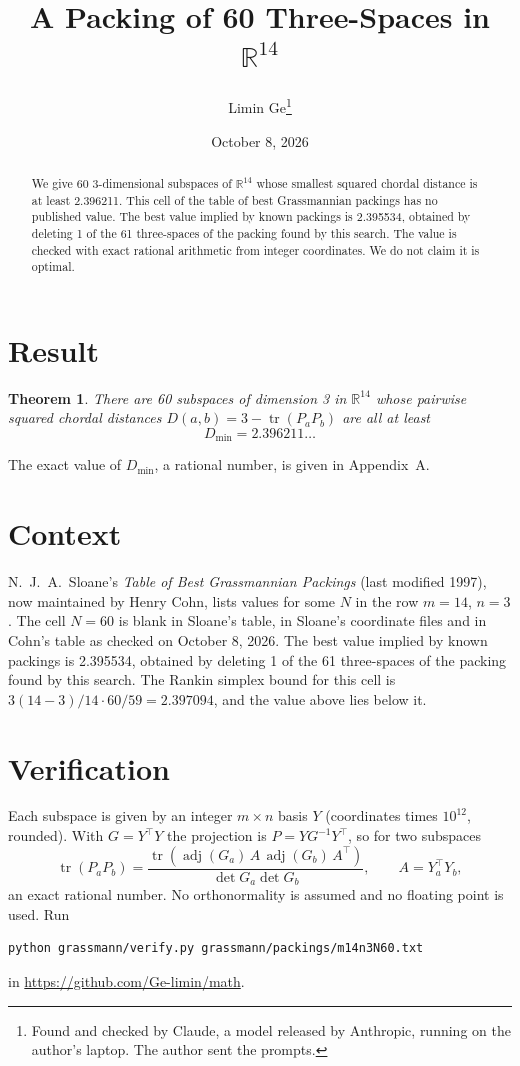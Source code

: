 \documentclass[11pt,a4paper]{article}
\title{A Packing of 60 Three-Spaces in $\mathbb{R}^{14}$}
\author{Limin Ge\thanks{Found and checked by Claude, a model released by Anthropic, running on the author's laptop. The author sent the prompts.}}
\date{October 8, 2026}
\newtheorem*{theorem}{Theorem}
\begin{document}
\maketitle
\begin{abstract}
We give 60 3-dimensional subspaces of $\mathbb{R}^{14}$ whose smallest squared chordal distance is at least 2.396211. This cell of the table of best Grassmannian packings has no published value. The best value implied by known packings is 2.395534, obtained by deleting 1 of the 61 three-spaces of the packing found by this search. The value is checked with exact rational arithmetic from integer coordinates. We do not claim it is optimal.
\end{abstract}

\section{Result}
\begin{theorem}
There are 60 subspaces of dimension 3 in $\mathbb{R}^{14}$ whose pairwise squared chordal distances $D(a,b) = 3 - \operatorname{tr}(P_aP_b)$ are all at least
\[ D_{\min} = 2.396211\ldots \]
\end{theorem}
The exact value of $D_{\min}$, a rational number, is given in Appendix~A.


\section{Context}
N.~J.~A.~Sloane's \emph{Table of Best Grassmannian Packings} (last modified 1997), now maintained by Henry Cohn, lists values for some $N$ in the row $m=14$, $n=3$. The cell $N=60$ is blank in Sloane's table, in Sloane's coordinate files and in Cohn's table as checked on October 8, 2026. The best value implied by known packings is 2.395534, obtained by deleting 1 of the 61 three-spaces of the packing found by this search. The Rankin simplex bound for this cell is $3(14-3)/14\cdot 60/59 = 2.397094$, and the value above lies below it.


\section{Verification}
Each subspace is given by an integer $m\times n$ basis $Y$ (coordinates times $10^{12}$, rounded). With $G=Y^\top Y$ the projection is $P=YG^{-1}Y^\top$, so for two subspaces
\[ \operatorname{tr}(P_aP_b)=\frac{\operatorname{tr}(\operatorname{adj}(G_a)\,A\,\operatorname{adj}(G_b)\,A^\top)}{\det G_a\det G_b},\qquad A=Y_a^\top Y_b, \]
an exact rational number. No orthonormality is assumed and no floating point is used. Run
\begin{verbatim}
python grassmann/verify.py grassmann/packings/m14n3N60.txt
\end{verbatim}
in \url{https://github.com/Ge-limin/math}.
\end{document}
